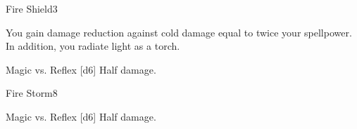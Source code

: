 \begin{spellsection}{Fire Shield}{3}
    \begin{spellheader}
    \end{spellheader}
    \begin{spellcontent}
        \begin{spelleffects}
            \spelleffect You gain damage reduction against cold damage equal to twice your spellpower. In addition, you radiate light as a torch.
            \spelldur \durshort \dismissable
        \end{spelleffects}
    \end{spellcontent}
    \begin{spellsubcontent}
        \begin{spelltargetinginfo}
        \end{spelltargetinginfo}
        \begin{spelleffects}
            \begin{spellattack}{Magic vs. Reflex}
                \spellsuccess {}[d6]
                \spellfailure Half damage.
            \end{spellattack}
        \end{spelleffects}
    \end{spellsubcontent}
    \begin{spellfooter}
        \miscastexplode
    \end{spellfooter}
\end{spellsection}

\begin{spellsection}{Fire Storm}{8}
    \begin{spellheader}
    \end{spellheader}
    \begin{spellcontent}
        \begin{spelltargetinginfo}
        \end{spelltargetinginfo}
        \begin{spelleffects}
            \begin{spellattack}{Magic vs. Reflex}
                \spellsuccess {}[d6]
                \spellfailure Half damage.
            \end{spellattack}
        \end{spelleffects}
    \end{spellcontent}
    \begin{spellfooter}
        \miscastyou
    \end{spellfooter}
\end{spellsection}

